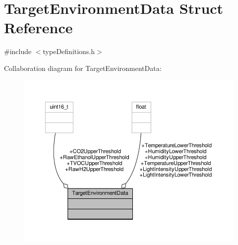 \hypertarget{structTargetEnvironmentData}{}\section{Target\+Environment\+Data Struct Reference}
\label{structTargetEnvironmentData}


{\ttfamily \#include $<$type\+Definitions.\+h$>$}



Collaboration diagram for Target\+Environment\+Data\+:\nopagebreak
\begin{figure}[H]
\begin{center}
\leavevmode
\includegraphics[width=350pt]{structTargetEnvironmentData__coll__graph}
\end{center}
\end{figure}
